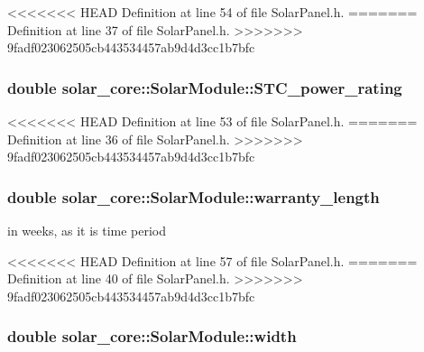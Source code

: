 <<<<<<< HEAD
Definition at line 54 of file Solar\+Panel.\+h.
=======
Definition at line 37 of file Solar\+Panel.\+h.
>>>>>>> 9fadf023062505cb443534457ab9d4d3cc1b7bfc

\hypertarget{classsolar__core_1_1_solar_module_ada72a54d3a914a88fd3942f1a09065c1}{}
\subsubsection[{S\+T\+C\+\_\+power\+\_\+rating}]{\setlength{\rightskip}{0pt plus 5cm}double solar\+\_\+core\+::\+Solar\+Module\+::\+S\+T\+C\+\_\+power\+\_\+rating}\label{classsolar__core_1_1_solar_module_ada72a54d3a914a88fd3942f1a09065c1}


<<<<<<< HEAD
Definition at line 53 of file Solar\+Panel.\+h.
=======
Definition at line 36 of file Solar\+Panel.\+h.
>>>>>>> 9fadf023062505cb443534457ab9d4d3cc1b7bfc

\hypertarget{classsolar__core_1_1_solar_module_a88f461fc1142688294bf19ca02b7ec0d}{}
\subsubsection[{warranty\+\_\+length}]{\setlength{\rightskip}{0pt plus 5cm}double solar\+\_\+core\+::\+Solar\+Module\+::warranty\+\_\+length}\label{classsolar__core_1_1_solar_module_a88f461fc1142688294bf19ca02b7ec0d}
in weeks, as it is time period 

<<<<<<< HEAD
Definition at line 57 of file Solar\+Panel.\+h.
=======
Definition at line 40 of file Solar\+Panel.\+h.
>>>>>>> 9fadf023062505cb443534457ab9d4d3cc1b7bfc

\hypertarget{classsolar__core_1_1_solar_module_a72b5c417f88deb65818e96b5fcf52ef9}{}
\subsubsection[{width}]{\setlength{\rightskip}{0pt plus 5cm}double solar\+\_\+core\+::\+Solar\+Module\+::width}\label{classsolar__core_1_1_solar_module_a72b5c417f88deb65818e96b5fcf52ef9}


